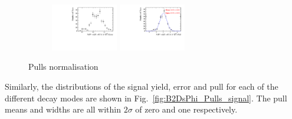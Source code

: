\begin{figure}[!h]
\begin{subfigure}[t]{1.0\textwidth}
      \includegraphics[width=0.32\textwidth]{figs/B2DsPhi/Plots_DsKK_Error_yield_peak_DsD0_Ds2KPiPi_toy_both_DsBDTbin1_PhiBDTbin1_both_both.pdf}
      \includegraphics[width=0.32\textwidth]{figs/B2DsPhi/Plots_DsKK_Pull_yield_peak_DsD0_Ds2KPiPi_toy_both_DsBDTbin1_PhiBDTbin1_both_both.pdf}
      \caption{\decay{\Dsp}{\Kp\pim\pip}}
   \end{subfigure}

   \caption{Pulls normalisation}
   \label{fig:B2DsPhi_Pulls_normalisation}
\end{figure}


Similarly, the distributions of the signal yield, error and pull for each of the different \Dsp decay modes are shown in Fig.~\ref{fig:B2DsPhi_Pulls_signal}. The pull means and widths are all within $2\sigma$ of zero and one respectively.


